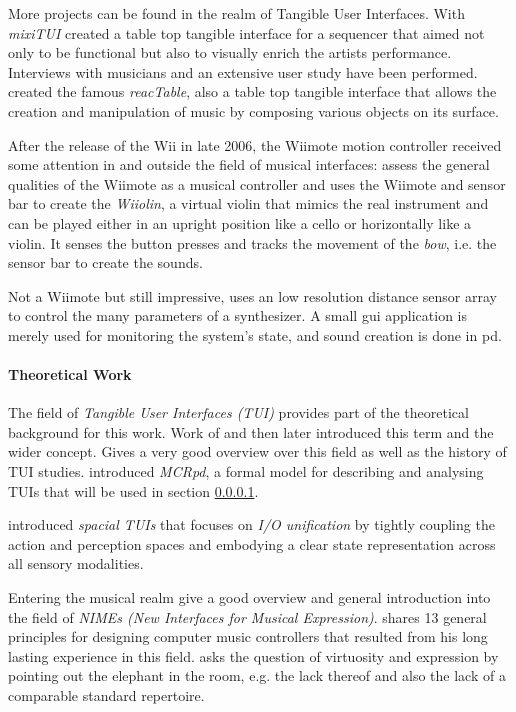 \documentclass[10pt,a4paper]{scrartcl}
\begin{document}
More projects can be found in the realm of Tangible User Interfaces. With \emph{mixiTUI} \cite{Pedersen2009} created a table top tangible interface for a sequencer that aimed not only to be functional but also to visually enrich the artists performance. Interviews with musicians and an extensive user study have been performed. \cite{Jorda2007} created the famous \emph{reacTable}, also a table top tangible interface that allows the creation and manipulation of music by composing various objects on its surface. 

After the release of the Wii in late 2006, the Wiimote motion controller received some attention in and outside the field of musical interfaces: 
\cite{Kiefer2008} assess the general qualities of the Wiimote as a musical controller and \cite{Miller2010} uses the Wiimote and sensor bar to create the \emph{Wiiolin}, a virtual violin that mimics the real instrument and can be played either in an upright position like a cello or horizontally like a violin. It senses the button presses and tracks the movement of the \emph{bow}, i.e. the sensor bar to create the sounds.

Not a Wiimote but still impressive, \cite{Miyama2010} uses an low resolution distance sensor array to control the many parameters of a synthesizer. A small gui application is merely used for monitoring the system's state, and sound creation is done in pd.


\paragraph{Theoretical Work}
The field of \emph{Tangible User Interfaces (TUI)} provides part of the theoretical background for this work. Work of \cite{Fitzmaurice1995} and then later \cite{Ishii1997} introduced this term and the wider concept. \cite{Shaer2009} Gives a very good overview over this field as well as the history of TUI studies. \cite{Ullmer2000} introduced \emph{MCRpd}, a formal model for describing and analysing TUIs that will be used in section \ref{}.

\cite{Sharlin2004} introduced \emph{spacial TUIs} that focuses on \emph{I/O unification} by tightly coupling the action and perception spaces and embodying a clear state representation across all sensory modalities.


Entering the musical realm \cite{Fels2011} give a good overview and general introduction into the field of \emph{NIMEs (New Interfaces for Musical Expression)}. \cite{Cook2001} shares 13 general principles for designing computer music controllers that resulted from his long lasting experience in this field. \cite{Dobrian2006} asks the question of virtuosity and expression by pointing out the elephant in the room, e.g. the lack thereof and also the lack of a comparable standard repertoire. 
\end{document}
